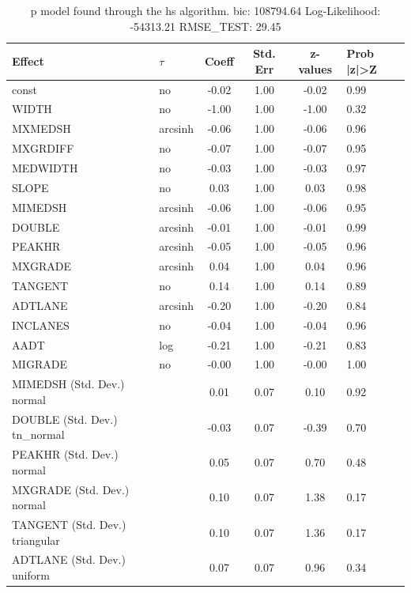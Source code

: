 \begin{table}
	\caption{p model found through the hs algorithm. bic: 108794.64 Log-Likelihood: -54313.21 RMSE_TEST: 29.45}
	\begin{center}
		\begin{tabular}{|l|l|c|c|c|l|}
			\hline
			Effect & $\tau$ & Coeff & Std. Err & z-values & Prob |z|>Z \\
			\hline
			const & no & -0.02 & 1.00 & -0.02 & 0.99 \\
			\hline
			WIDTH & no & -1.00 & 1.00 & -1.00 & 0.32 \\
			\hline
			MXMEDSH & arcsinh & -0.06 & 1.00 & -0.06 & 0.96 \\
			\hline
			MXGRDIFF & no & -0.07 & 1.00 & -0.07 & 0.95 \\
			\hline
			MEDWIDTH & no & -0.03 & 1.00 & -0.03 & 0.97 \\
			\hline
			SLOPE & no & 0.03 & 1.00 & 0.03 & 0.98 \\
			\hline
			MIMEDSH & arcsinh & -0.06 & 1.00 & -0.06 & 0.95 \\
			\hline
			DOUBLE & arcsinh & -0.01 & 1.00 & -0.01 & 0.99 \\
			\hline
			PEAKHR & arcsinh & -0.05 & 1.00 & -0.05 & 0.96 \\
			\hline
			MXGRADE & arcsinh & 0.04 & 1.00 & 0.04 & 0.96 \\
			\hline
			TANGENT & no & 0.14 & 1.00 & 0.14 & 0.89 \\
			\hline
			ADTLANE & arcsinh & -0.20 & 1.00 & -0.20 & 0.84 \\
			\hline
			INCLANES & no & -0.04 & 1.00 & -0.04 & 0.96 \\
			\hline
			AADT & log & -0.21 & 1.00 & -0.21 & 0.83 \\
			\hline
			MIGRADE & no & -0.00 & 1.00 & -0.00 & 1.00 \\
			\hline
			MIMEDSH (Std. Dev.) normal &  & 0.01 & 0.07 & 0.10 & 0.92 \\
			\hline
			DOUBLE (Std. Dev.) tn_normal &  & -0.03 & 0.07 & -0.39 & 0.70 \\
			\hline
			PEAKHR (Std. Dev.) normal &  & 0.05 & 0.07 & 0.70 & 0.48 \\
			\hline
			MXGRADE (Std. Dev.) normal &  & 0.10 & 0.07 & 1.38 & 0.17 \\
			\hline
			TANGENT (Std. Dev.) triangular &  & 0.10 & 0.07 & 1.36 & 0.17 \\
			\hline
			ADTLANE (Std. Dev.) uniform &  & 0.07 & 0.07 & 0.96 & 0.34 \\

\end{tabular}
\end{center}
\end{table}
